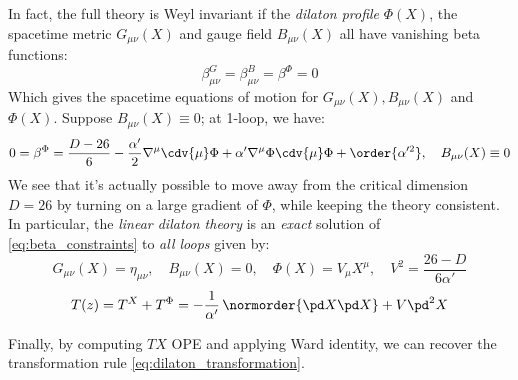 \documentclass[a4paper
	,10pt
]{article}
\begin{document}
	In fact, the full theory is Weyl invariant if the \textit{dilaton profile} $\Phi(X)$, the spacetime metric $G_{\mu\nu}(X)$ and gauge field $B_{\mu\nu}(X)$ all have vanishing beta functions:
	\begin{equation}
		\beta^G_{\mu\nu}
		= \beta^B_{\mu\nu}
		= \beta^\Phi = 0
	\label{eq:beta_constraints}
	\end{equation}
	Which gives the spacetime equations of motion for $G_{\mu\nu}(X), B_{\mu\nu}(X)$ and $\Phi(X)$. 
	Suppose $B_{\mu\nu}(X) \equiv 0$; at 1-loop, we have:
	\begin{equation}
		0 = \beta^\Phi
		= \frac{D - 26}{6}
			- \frac{\alpha'}{2} \nabla^\mu \cdv{\mu} \Phi
			+ \alpha' \nabla^\mu \Phi \cdv{\mu} \Phi
			+ \order{\alpha'^2},
	\quad
		B_{\mu\nu}(X) \equiv 0
	\end{equation}
	We see that it's actually possible to move away from the critical dimension $D = 26$ by turning on a large gradient of $\Phi$, while keeping the theory consistent. In particular, the \textit{linear dilaton theory} is an \textit{exact} solution of \eqref{eq:beta_constraints} to \textit{all loops} given by:
	\begin{equation}
		G_{\mu\nu}(X) = \eta_{\mu\nu},
	\quad
		B_{\mu\nu}(X) = 0,
	\quad
		\Phi(X) = V_\mu X^\mu,
	\quad
		V^2 = \frac{26 - D}{6\alpha'}
	\end{equation}
	\vspace{-.5\baselineskip}
	\begin{equation}
		T(z)
		= T^X + T^\Phi
		= -\frac{1}{\alpha'}\, \normorder{\pd X \pd X}
			+ V \pd^2 X
	\end{equation}
	
	Finally, by computing $TX$ OPE and applying Ward identity, we can recover the transformation rule \eqref{eq:dilaton_transformation}. 
	
	
	
	
	
	
	
\vspace{1.2\baselineskip}
\raggedright
\printbibliography[%
	,heading = bibintoc
]
\end{document}

